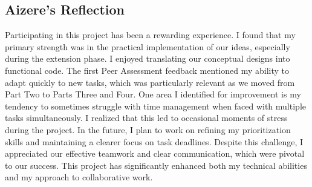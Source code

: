 \documentclass{article}
\begin{document}
\subsection{Aizere's Reflection}
Participating in this project has been a rewarding experience. I found that my primary strength was in the practical implementation of our ideas, especially during the extension phase. I enjoyed translating our conceptual designs into functional code. The first Peer Assessment feedback mentioned my ability to adapt quickly to new tasks, which was particularly relevant as we moved from Part Two to Parts Three and Four. One area I identified for improvement is my tendency to sometimes struggle with time management when faced with multiple tasks simultaneously. I realized that this led to occasional moments of stress during the project. In the future, I plan to work on refining my prioritization skills and maintaining a clearer focus on task deadlines. Despite this challenge, I appreciated our effective teamwork and clear communication, which were pivotal to our success. This project has significantly enhanced both my technical abilities and my approach to collaborative work.
\end{document}
